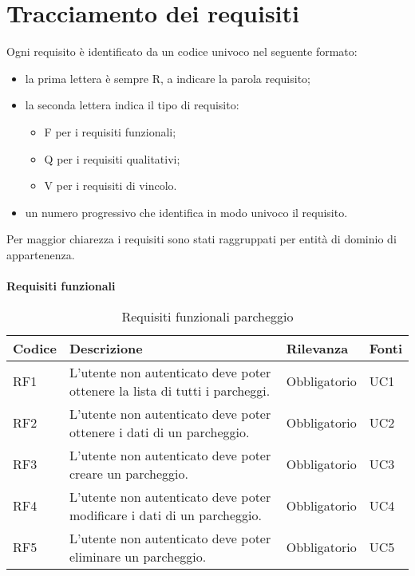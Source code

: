 \section{Tracciamento dei requisiti}
Ogni requisito è identificato da un codice univoco nel seguente formato:
\begin{itemize}
    \item la prima lettera è sempre R, a indicare la parola requisito;
    \item la seconda lettera indica il tipo di requisito:
    \begin{itemize}
        \item F per i requisiti funzionali;
        \item Q per i requisiti qualitativi;
        \item V per i requisiti di vincolo.
    \end{itemize}
    \item un numero progressivo che identifica in modo univoco il requisito.
\end{itemize}
Per maggior chiarezza i requisiti sono stati raggruppati per entità di dominio di appartenenza.
\\\\
\textbf{Requisiti funzionali}

\begin{table}[H]
    \begin{tabular}{|p{1cm}|p{6cm}|p{1.9cm}|p{1.8cm}|} 
    \hline
    Codice & Descrizione & Rilevanza &  Fonti \\ 
    \hline
    RF1 & L'utente non autenticato deve poter ottenere la lista di tutti i parcheggi. & Obbligatorio & UC1 \\ 
    \hline
    RF2 & L'utente non autenticato deve poter ottenere i dati di un parcheggio. & Obbligatorio & UC2 \\ 
    \hline
    RF3 & L'utente non autenticato deve poter creare un parcheggio. & Obbligatorio & UC3 \\ 
    \hline
    RF4 & L'utente non autenticato deve poter modificare i dati di un parcheggio. & Obbligatorio & UC4 \\
    \hline
    RF5 & L'utente non autenticato deve poter eliminare un parcheggio. & Obbligatorio & UC5 \\ 
    \hline
    \end{tabular}
    \caption{Requisiti funzionali parcheggio}
\end{table}


